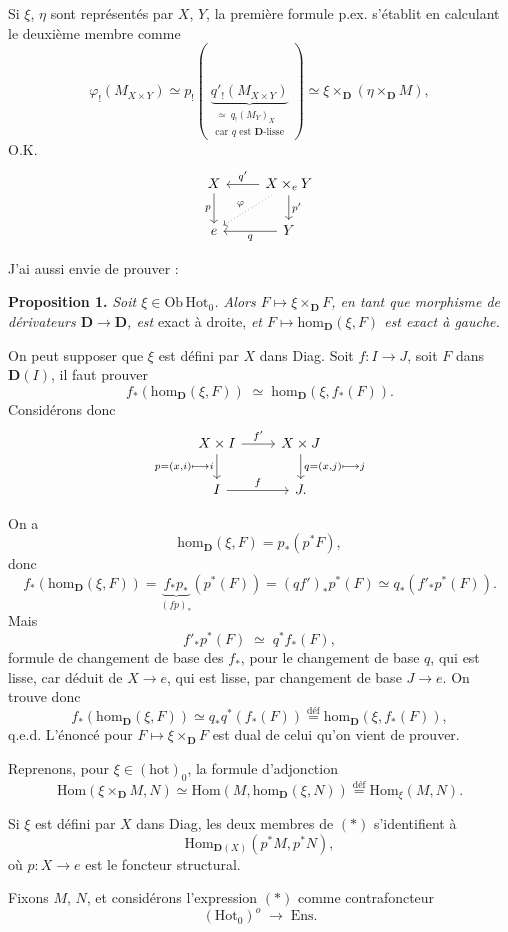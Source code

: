 \documentclass[11pt]{article}
\newcommand{\printedpage}[1]{\marginpar{\footnotesize p.~#1}}
\newcommand{\msp}[1]{\marginpar{\footnotesize [#1]}}
\newcommand{\Hot}{\mathrm{Hot}}
\newcommand{\D}{\mathbf{D}}
\newcommand{\hm}{\mathrm{hom}}
\newcommand{\Hom}{\mathrm{Hom}}
\newcommand{\Ob}{\mathrm{Ob}\,}
\newcommand{\defeq}{\overset{\text{déf}}{=}}
\begin{document}
Si $\xi$, $\eta$ sont représentés par $X$, $Y$, la première formule p.ex.
\msp{page 6}
s’établit en calculant le deuxième membre comme
\[
\varphi_!(M_{X\times Y})\simeq p_!(\;\underbrace{q'_!(M_{X\times Y})}_{\substack{\simeq\ q_!(M_Y)_X\\ \text{car $q$ est $\mathbf{D}$-lisse}}}\;)\simeq\xi\times_{\D}(\eta\times_{\D}M),
\]
O.K.
\[
\begin{tikzcd}
X \ar[d,"p"'] & X\times_e Y \ar[l,"q'"'] \ar[d,"p'"] \ar[dl,dotted,"\varphi"'] \\
e & Y \ar[l,"q"]
\end{tikzcd}
\]

J’ai aussi envie de prouver :

\textbf{Proposition 1.} \textit{Soit $\xi\in\Ob\Hot_0$. Alors $F\longmapsto\xi\times_{\D}F$, en tant que morphisme de dérivateurs $\D\longrightarrow\D$, est} exact à droite, \textit{et $F\longmapsto\hm_{\D}(\xi,F)$ est exact à gauche.}

On peut supposer que $\xi$ est défini par $X$ dans Diag. Soit $f:I\longrightarrow J$, soit $F$ dans $\D(I)$, il faut prouver
\[
f_*(\hm_{\D}(\xi,F))\;\simeq\;\hm_{\D}(\xi,f_*(F)).
\]
Considérons donc
\[
\begin{tikzcd}
X\times I \ar[r,"f'"] \ar[d,"{p=(x,i)\longmapsto i}"'] & X\times J \ar[d,"{q=(x,j)\longmapsto j}"] \\
I \ar[r,"f"] & J.
\end{tikzcd}
\]

On a
\[
\hm_{\D}(\xi,F)=p_*(p^*F),
\]
donc
\[
f_*(\hm_{\D}(\xi,F))=\underbrace{f_*p_*}_{(fp)_*}(p^*(F))=(qf')_*p^*(F)\simeq q_*(f'_*p^*(F)).
\]
Mais
\[
f'_*p^*(F)\;\simeq\;q^*f_*(F),
\]
formule de changement de base des $f_*$, pour le changement de base $q$, qui est lisse, car déduit de $X\longrightarrow e$, qui est lisse, par changement de base $J\longrightarrow e$. On trouve
\printedpage{5}
\msp{page 7}
donc
\[
f_*(\hm_{\D}(\xi,F))\simeq q_*q^*(f_*(F))\defeq\hm_{\D}(\xi,f_*(F)),
\]
q.e.d. L’énoncé pour $F\longmapsto\xi\times_{\D}F$ est dual de celui qu’on vient de prouver.

Reprenons, pour $\xi\in(\mathrm{hot})_0$, la formule d’adjonction
\[
\Hom(\xi\times_{\D}M,N)\simeq\Hom(M,\hm_{\D}(\xi,N))\defeq\Hom_{\xi}(M,N).
\tag*{$(*)$}
\]

Si $\xi$ est défini par $X$ dans Diag, les deux membres de $(*)$ s’identifient à
\[
\Hom_{\D(X)}(p^*M,p^*N),
\]
où $p:X\longrightarrow e$ est le foncteur structural.

Fixons $M$, $N$, et considérons l’expression $(*)$ comme contrafoncteur
\[
(\Hot_0)^o\;\longrightarrow\;\mathrm{Ens}.
\]
\end{document}
